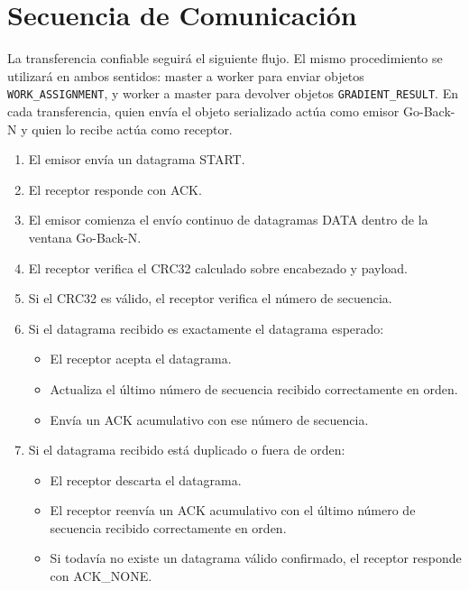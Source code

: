 \documentclass[12pt]{article}
\begin{document}
\section{Secuencia de Comunicación}

La transferencia confiable seguirá el siguiente flujo. El mismo procedimiento se utilizará en ambos sentidos: master a worker para enviar objetos \texttt{WORK\_ASSIGNMENT}, y worker a master para devolver objetos \texttt{GRADIENT\_RESULT}. En cada transferencia, quien envía el objeto serializado actúa como emisor Go-Back-N y quien lo recibe actúa como receptor.

\begin{enumerate}

\item El emisor envía un datagrama START.

\item El receptor responde con ACK.

\item El emisor comienza el envío continuo de datagramas DATA dentro de la ventana Go-Back-N.

\item El receptor verifica el CRC32 calculado sobre encabezado y payload.

\item Si el CRC32 es válido, el receptor verifica el número de secuencia.

\item Si el datagrama recibido es exactamente el datagrama esperado:
\begin{itemize}
\item El receptor acepta el datagrama.
\item Actualiza el último número de secuencia recibido correctamente en orden.
\item Envía un ACK acumulativo con ese número de secuencia.
\end{itemize}

\item Si el datagrama recibido está duplicado o fuera de orden:
\begin{itemize}
\item El receptor descarta el datagrama.
\item El receptor reenvía un ACK acumulativo con el último número de secuencia recibido correctamente en orden.
\item Si todavía no existe un datagrama válido confirmado, el receptor responde con ACK\_NONE.
\end{itemize}


\end{enumerate}
\end{document}

